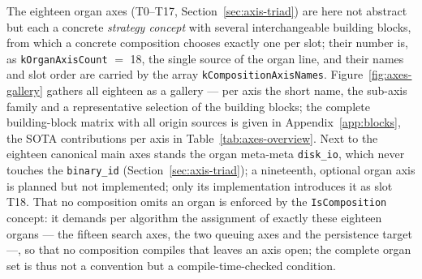 \begin{nurlang}
The eighteen organ axes (T0--T17, Section~\ref{sec:axis-triad}) are here not abstract but each a
concrete \emph{strategy concept} with several interchangeable building blocks, from which a concrete
composition chooses exactly one per slot; their number is, as \texttt{kOrganAxisCount} $=$ 18, the
single source of the organ line, and their names and slot order are carried by the array
\texttt{kCompositionAxisNames}. Figure~\ref{fig:axes-gallery} gathers all eighteen as a gallery --- per
axis the short name, the sub-axis family and a representative selection of the building blocks; the
complete building-block matrix with all origin sources is given in Appendix~\ref{app:blocks}, the SOTA
contributions per axis in Table~\ref{tab:axes-overview}.
Next to the eighteen canonical main axes stands the organ meta-meta \texttt{disk\_io}, which never
touches the \texttt{binary\_id} (Section~\ref{sec:axis-triad}); a nineteenth, optional organ axis is
planned but not implemented; only its implementation introduces it as slot T18.
That no composition omits an organ is enforced by the \texttt{IsComposition} concept: it demands per
algorithm the assignment of exactly these eighteen organs --- the fifteen search axes, the two queuing
axes and the persistence target ---, so that no composition compiles that leaves an axis open; the
complete organ set is
thus not a convention but a compile-time-checked condition.
\begin{figure}[htbp]\centering
\end{figure}
\end{nurlang}
